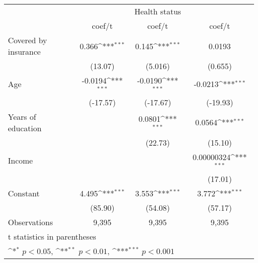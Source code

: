 {
\def\sym#1{\ifmmode^{#1}\else\(^{#1}\)\fi}
\begin{tabular}{l*{3}{c}}
\hline\hline
                &\multicolumn{1}{c}{}&\multicolumn{1}{c}{Health status}&\multicolumn{1}{c}{}\\
                &   coef/t         &   coef/t         &   coef/t         \\
\hline
Covered by insurance&    0.366\sym{***}&    0.145\sym{***}&   0.0193         \\
                &  (13.07)         &  (5.016)         &  (0.655)         \\
Age             &  -0.0194\sym{***}&  -0.0190\sym{***}&  -0.0213\sym{***}\\
                & (-17.57)         & (-17.67)         & (-19.93)         \\
Years of education&                  &   0.0801\sym{***}&   0.0564\sym{***}\\
                &                  &  (22.73)         &  (15.10)         \\
Income          &                  &                  &0.00000324\sym{***}\\
                &                  &                  &  (17.01)         \\
Constant        &    4.495\sym{***}&    3.553\sym{***}&    3.772\sym{***}\\
                &  (85.90)         &  (54.08)         &  (57.17)         \\
\hline
Observations    &    9,395         &    9,395         &    9,395         \\
\hline\hline
\multicolumn{4}{l}{\footnotesize t statistics in parentheses}\\
\multicolumn{4}{l}{\footnotesize \sym{*} \(p<0.05\), \sym{**} \(p<0.01\), \sym{***} \(p<0.001\)}\\
\end{tabular}
}
